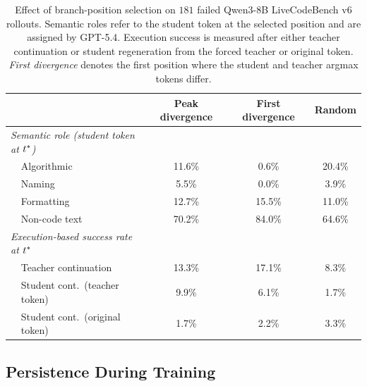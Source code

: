 \begin{table}[ht]
  \caption{Effect of branch-position selection on $181$ failed Qwen3-8B LiveCodeBench v6 rollouts. Semantic roles refer to the student token at the selected position and are assigned by GPT-5.4. Execution success is measured after either teacher continuation or student regeneration from the forced teacher or original token. \emph{First divergence} denotes the first position where the student and teacher argmax tokens differ.}
  \label{tab:steer_qwen8b_positions}
  \centering
  \small
  \begin{tabular*}{0.82\linewidth}{@{\extracolsep{\fill}}llccc@{\hspace{6pt}}}
    \toprule
    & & Peak divergence & First divergence & Random \\
    \midrule
    \multicolumn{2}{l}{\textit{Semantic role ({student token at $t^{*}$})}} \\
    & Algorithmic   & 11.6\% &  0.6\% & 20.4\% \\
    & Naming        &  5.5\% &  0.0\% &  3.9\% \\
    & Formatting    & 12.7\% & 15.5\% & 11.0\% \\
    & Non-code text & 70.2\% & 84.0\% & 64.6\% \\
    \midrule
    \multicolumn{2}{l}{\textit{Execution-based success rate at $t^{*}$}} \\
    & Teacher continuation
      & 13.3\% & 17.1\% & 8.3\% \\
    & Student cont.\ (teacher token)
      & 9.9\% & 6.1\% & 1.7\% \\
    & Student cont.\ (original token)
      & 1.7\% & 2.2\% & 3.3\% \\
    \bottomrule
  \end{tabular*}
\end{table}
































\subsection{Persistence During Training}
\label{app:stepwise}

